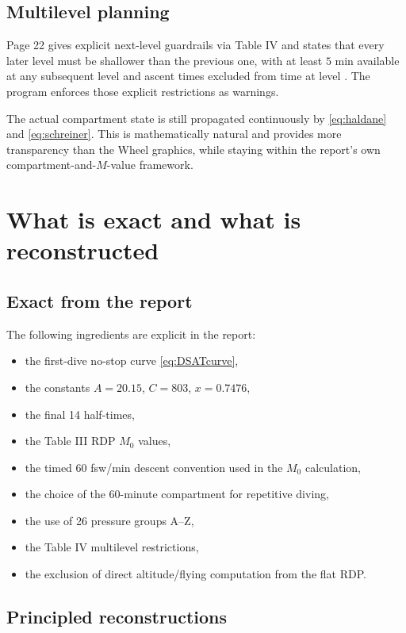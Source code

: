 \documentclass[11pt]{article}
\begin{document}
\subsection{Multilevel planning}

Page 22 gives explicit next-level guardrails via Table IV and states that every later level must be shallower than the previous one, with at least $5$ min available at any subsequent level and ascent times excluded from time at level \cite[p.~22]{Hamilton1994}. The program enforces those explicit restrictions as warnings.

The actual compartment state is still propagated continuously by \eqref{eq:haldane} and \eqref{eq:schreiner}. This is mathematically natural and provides more transparency than the Wheel graphics, while staying within the report's own compartment-and-$M$-value framework.

\section{What is exact and what is reconstructed}

\subsection{Exact from the report}

The following ingredients are explicit in the report:
\begin{itemize}
\item the first-dive no-stop curve \eqref{eq:DSATcurve},
\item the constants $A=20.15$, $C=803$, $x=0.7476$,
\item the final 14 half-times,
\item the Table III RDP $M_0$ values,
\item the timed $60$ fsw/min descent convention used in the $M_0$ calculation,
\item the choice of the 60-minute compartment for repetitive diving,
\item the use of 26 pressure groups A--Z,
\item the Table IV multilevel restrictions,
\item the exclusion of direct altitude/flying computation from the flat RDP.
\end{itemize}

\subsection{Principled reconstructions}
\end{document}
